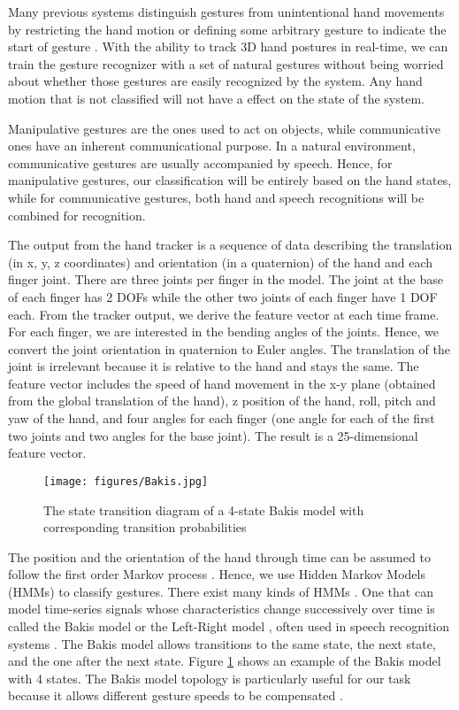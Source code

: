 Many previous systems distinguish gestures from unintentional hand movements by restricting the hand motion or defining some arbitrary gesture to indicate the start of gesture \cite{Shin04}. With the ability to track 3D hand postures in real-time, we can train the gesture recognizer with a set of natural gestures without being worried about whether those gestures are easily recognized by the system. Any hand motion that is not classified will not have a effect on the state of the system.

Manipulative gestures are the ones used to act on objects, while communicative ones have an inherent communicational purpose\cite{Pavlovic97}. In a natural environment, communicative gestures are usually accompanied by speech. Hence, for manipulative gestures, our classification will be entirely based on the hand states, while for communicative gestures, both hand and speech recognitions will be combined for recognition. 

The output from the hand tracker is a sequence of data describing the translation (in x, y, z coordinates) and orientation (in a quaternion) of the hand and each finger joint. There are three joints per finger in the model. The joint at the base of each finger has 2 DOFs while the other two joints of each finger have 1 DOF each. From the tracker output, we derive the feature vector at each time frame. For each finger, we are interested in the bending angles of the joints. Hence, we convert the joint orientation in quaternion to Euler angles. The translation of the joint is irrelevant because it is relative to the hand and stays the same. The feature vector includes the speed of hand movement in the x-y plane (obtained from the global translation of the hand), z position of the hand, roll, pitch and yaw of the hand, and four angles for each finger (one angle for each of the first two joints and two angles for the base joint). The result is a 25-dimensional feature vector.

\begin{figure}[htp]
\begin{center}
\texttt{[image: figures/Bakis.jpg]}
\caption{{The state transition diagram of a 4-state Bakis model with corresponding transition probabilities}}\label{fig:bakis}
\end{center}
\end{figure}

The position and the orientation of the hand through time can be assumed to follow the first order Markov process \cite{Starner95}. Hence, we use Hidden Markov Models (HMMs) to classify gestures. There exist many kinds of HMMs \cite{Rabiner86}. One that can model time-series signals whose characteristics change successively over time is called the Bakis model \cite{Bauer00} or the Left-Right model \cite{Rabiner90}, often used in speech recognition systems \cite{Bauer00}. The Bakis model allows transitions to the same state, the next state, and the one after the next state.  Figure \ref{fig:bakis} shows an example of the Bakis model with 4 states. The Bakis model topology is particularly useful for our task because it allows different gesture speeds to be compensated \cite{Bauer00}.
	
